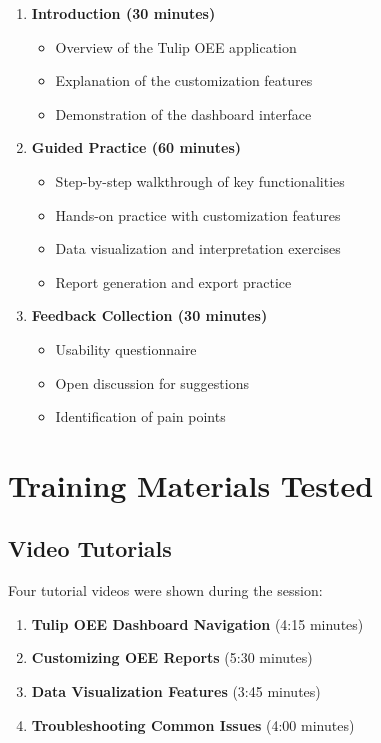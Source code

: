 \documentclass[12pt, letterpaper]{article}
\begin{document}
\begin{enumerate}
    \item \textbf{Introduction (30 minutes)}
    \begin{itemize}
        \item Overview of the Tulip OEE application
        \item Explanation of the customization features
        \item Demonstration of the dashboard interface
    \end{itemize}
    
    \item \textbf{Guided Practice (60 minutes)}
    \begin{itemize}
        \item Step-by-step walkthrough of key functionalities
        \item Hands-on practice with customization features
        \item Data visualization and interpretation exercises
        \item Report generation and export practice
    \end{itemize}
    
    \item \textbf{Feedback Collection (30 minutes)}
    \begin{itemize}
        \item Usability questionnaire
        \item Open discussion for suggestions
        \item Identification of pain points
    \end{itemize}
\end{enumerate}

\section{Training Materials Tested}

\subsection{Video Tutorials}
Four tutorial videos were shown during the session:
\begin{enumerate}
    \item \textbf{Tulip OEE Dashboard Navigation} (4:15 minutes)
    \item \textbf{Customizing OEE Reports} (5:30 minutes)
    \item \textbf{Data Visualization Features} (3:45 minutes)
    \item \textbf{Troubleshooting Common Issues} (4:00 minutes)
\end{enumerate}
\end{document}
